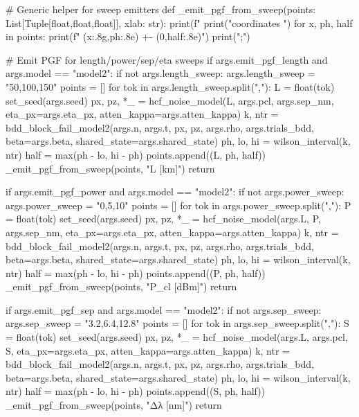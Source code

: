 {{{{    # Generic helper for sweep emitters
    def _emit_pgf_from_sweep(points: List[Tuple[float,float,float]], xlab: str):
        print(f"%
        print("coordinates {")
        for x, ph, half in points:
            print(f"  ({x:.8g},{ph:.8e}) +- (0,{half:.8e})")
        print("};")

    # Emit PGF for length/power/sep/eta sweeps
    if args.emit_pgf_length and args.model == "model2":
        if not args.length_sweep:
            args.length_sweep = "50,100,150"
        points = []
        for tok in args.length_sweep.split(","):
            L = float(tok)
            set_seed(args.seed)
            px, pz, *_ = hcf_noise_model(L, args.pcl, args.sep_nm, eta_px=args.eta_px, atten_kappa=args.atten_kappa)
            k, ntr = bdd_block_fail_model2(args.n, args.t, px, pz, args.rho, args.trials_bdd, beta=args.beta, shared_state=args.shared_state)
            ph, lo, hi = wilson_interval(k, ntr)
            half = max(ph - lo, hi - ph)
            points.append((L, ph, half))
        _emit_pgf_from_sweep(points, "L [km]")
        return

    if args.emit_pgf_power and args.model == "model2":
        if not args.power_sweep:
            args.power_sweep = "0,5,10"
        points = []
        for tok in args.power_sweep.split(","):
            P = float(tok)
            set_seed(args.seed)
            px, pz, *_ = hcf_noise_model(args.L, P, args.sep_nm, eta_px=args.eta_px, atten_kappa=args.atten_kappa)
            k, ntr = bdd_block_fail_model2(args.n, args.t, px, pz, args.rho, args.trials_bdd, beta=args.beta, shared_state=args.shared_state)
            ph, lo, hi = wilson_interval(k, ntr)
            half = max(ph - lo, hi - ph)
            points.append((P, ph, half))
        _emit_pgf_from_sweep(points, "P_cl [dBm]")
        return

    if args.emit_pgf_sep and args.model == "model2":
        if not args.sep_sweep:
            args.sep_sweep = "3.2,6.4,12.8"
        points = []
        for tok in args.sep_sweep.split(","):
            S = float(tok)
            set_seed(args.seed)
            px, pz, *_ = hcf_noise_model(args.L, args.pcl, S, eta_px=args.eta_px, atten_kappa=args.atten_kappa)
            k, ntr = bdd_block_fail_model2(args.n, args.t, px, pz, args.rho, args.trials_bdd, beta=args.beta, shared_state=args.shared_state)
            ph, lo, hi = wilson_interval(k, ntr)
            half = max(ph - lo, hi - ph)
            points.append((S, ph, half))
        _emit_pgf_from_sweep(points, "Δλ [nm]")
        return

}}}}
